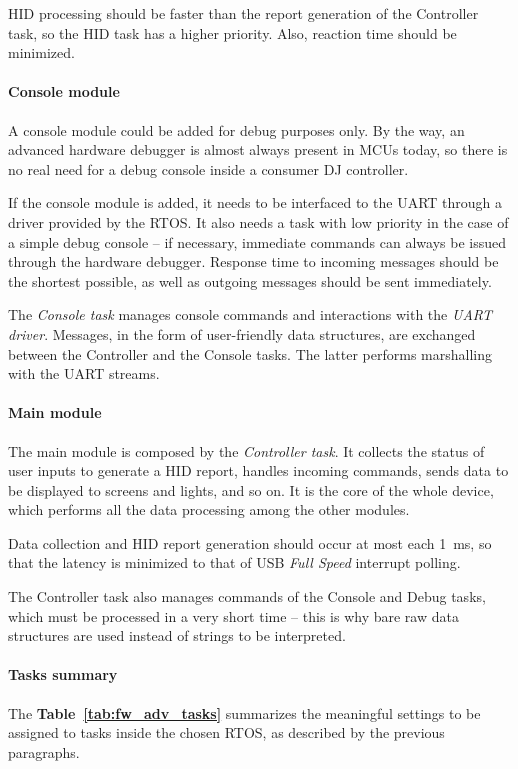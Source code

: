 \documentclass[a4paper,10pt]{article}
\newcommand{\citet}[1]{\textbf{Table~\ref{#1}}}
\begin{document}
\begin{multicols}{2}
HID processing should be faster than the report generation of the Controller
task, so the HID task has a higher priority. Also, reaction time should be
minimized.


\paragraph{Console module}
A console module could be added for debug purposes only. By the way, an
advanced hardware debugger is almost always present in MCUs today, so there is
no real need for a debug console inside a consumer DJ controller.

If the console module is added, it needs to be interfaced to the UART through
a driver provided by the RTOS. It also needs a task with low priority in the
case of a simple debug console -- if necessary, immediate commands can always
be issued through the hardware debugger. Response time to incoming messages
should be the shortest possible, as well as outgoing messages should be sent
immediately.

The \emph{Console task} manages console commands and interactions with the
\emph{UART driver}. Messages, in the form of user-friendly data structures,
are exchanged between the Controller and the Console tasks. The latter
performs marshalling with the UART streams. 


\paragraph{Main module}
The main module is composed by the \emph{Controller task}. It collects the
status of user inputs to generate a HID report, handles incoming commands,
sends data to be displayed to screens and lights, and so on. It is the core of
the whole device, which performs all the data processing among the other
modules.

Data collection and HID report generation should occur at most each 1~ms, so
that the latency is minimized to that of USB \emph{Full Speed} interrupt
polling.

The Controller task also manages commands of the Console and Debug tasks,
which must be processed in a very short time -- this is why bare raw data
structures are used instead of strings to be interpreted.


\paragraph{Tasks summary}
The \citet{tab:fw_adv_tasks} summarizes the meaningful settings to be assigned
to tasks inside the chosen RTOS, as described by the previous paragraphs.


\end{multicols}
\end{document}

